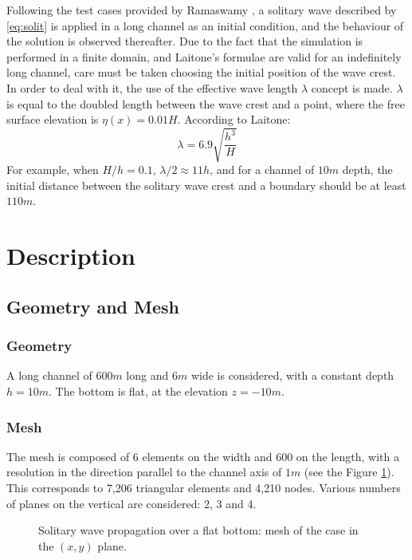 Following the test cases provided by Ramaswamy \cite{Ramaswamy1990}, a solitary wave described by
\eqref{eq:solit} is applied in a long channel as an initial condition, and the
behaviour of the solution is observed thereafter. Due to the fact that the simulation is
performed in a finite domain, and Laitone’s formulae are valid for an indefinitely long
channel, care must be taken choosing the initial position of the wave crest. In order to
deal with it, the use of the effective wave length $\lambda$ concept is made. $\lambda$ is equal to the
doubled length between the wave crest and a point, where the free surface elevation is
$\eta(x) = 0.01H$. According to Laitone:
\begin{equation}
\lambda = 6.9\sqrt{\dfrac{h^3}{H}}
\end{equation}
For example, when $H/h = 0.1$, $\lambda/2 \approx 11h$, and for a channel of $10 m$ depth, the initial
distance between the solitary wave crest and a boundary should be at least $110 m$.

\section{Description}
%
%
%
\subsection{Geometry and Mesh}

\subsubsection{Geometry}
A long channel of $600 m$ long and $6 m$ wide is considered, with a constant depth $h = 10 m$.
The bottom is flat, at the elevation $z = -10m$.

\subsubsection{Mesh}
The mesh is composed of 6 elements on the width and 600 on the length,
with a resolution in the direction parallel to the channel axis of $1 m$ (see the Figure \ref{fig:solit_mesh}).
This corresponds to 7,206 triangular elements and 4,210 nodes.
Various numbers of planes on the vertical are considered: 2, 3 and 4.
\begin{figure}[H]
\begin{center}
\end{center}
\caption{Solitary wave propagation over a flat bottom: mesh of the case in the $(x,y)$ plane.}
\label{fig:solit_mesh}
\end{figure}

